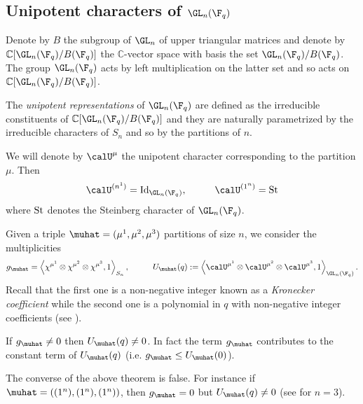 \subsection{Unipotent characters of \texorpdfstring{$\GL_n(\F_q)$}{GL\_n(F\_q)}}\label{unipotent}

Denote by $B$ the subgroup of $\GL_n$ of upper triangular matrices and denote by $\mathbb{C}[\GL_n(\F_q)/B(\F_q)]$ the $\mathbb{C}$-vector space with basis the set $\GL_n(\F_q)/B(\F_q)$. The group $\GL_n(\F_q)$ acts by left multiplication on the latter set and so acts on $\mathbb{C}[\GL_n(\F_q)/B(\F_q)]$.


The \emph{unipotent representations} of $\GL_n(\F_q)$ are defined as the irreducible constituents of $\mathbb{C}[\GL_n(\F_q)/B(\F_q)]$ and they are naturally parametrized by the irreducible characters of $S_n$ and so by the partitions of $n$.

We will denote by $\calU^\mu$ the unipotent character corresponding to the partition $\mu$. Then 
$$
\calU^{(n^1)}={\rm Id}_{\GL_n(\F_q)},\hspace{1cm}\calU^{(1^n)}={\rm St}
$$
where ${\rm St}$ denotes the Steinberg character of $\GL_n(\F_q)$.



Given a triple $\muhat=(\mu^1,\mu^2,\mu^3)$ partitions of size $n$, we consider the multiplicities
$$
g_\muhat=\left\langle \chi^{\mu^1}\otimes\chi^{\mu^2}\otimes\chi^{\mu^3},1\right\rangle_{S_n},\hspace{1cm} U_\muhat(q):=\left\langle \calU^{\mu^1}\otimes\calU^{\mu^2}\otimes\calU^{\mu^3},1\right\rangle_{\GL_n(\F_q)}.
$$
Recall that the first one is a non-negative integer  known as a \emph{Kronecker coefficient} while the second one is a polynomial in $q$ with non-negative integer coefficients (see \cite[Theorem 4]{L1}).



\begin{theo}\cite[Proposition 6]{L1} If $g_\muhat\neq 0$ then $U_\muhat(q)\neq 0$. In fact the term $g_\muhat$ contributes to the constant term of $U_\muhat(q)$ (i.e. $g_\muhat\leq U_\muhat(0)$).
	\label{L1-1}\end{theo}



The converse of the above theorem is false. For instance if $\muhat=((1^n),(1^n),(1^n))$, then $g_\muhat=0$ but $U_\muhat(q)\neq 0$ (see \cite[\S 3.6]{L1} for $n=3$).





